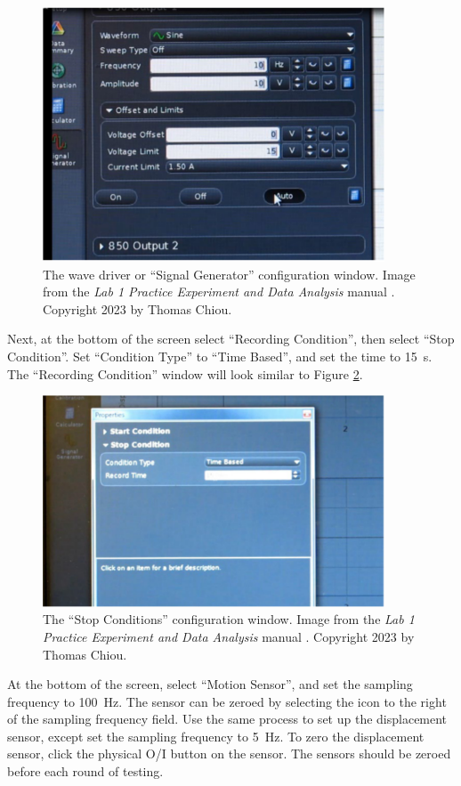 \documentclass[12 pt]{report}
\begin{document}
\begin{figure}[ht]
\centering
\includegraphics[width=4in]{images/Wave_Driver_Setup}
\caption{The wave driver or ``Signal Generator'' configuration window. Image from the \textit{Lab 1 Practice Experiment and Data Analysis} manual \cite{lab_procedures}. Copyright 2023 by Thomas Chiou.}
\label{fig:wave_driver_setup}
\end{figure}

Next, at the bottom of the screen select ``Recording Condition'', then select ``Stop Condition''. Set ``Condition Type'' to ``Time Based'', and set the time to \qty{15}{s}. The ``Recording Condition'' window will look similar to Figure \ref{fig:stop_conditions}. 

\begin{figure}[ht]
\centering
\includegraphics[width=4in]{images/Stop_Conditions}
\caption{The ``Stop Conditions'' configuration window. Image from the \textit{Lab 1 Practice Experiment and Data Analysis} manual \cite{lab_procedures}. Copyright 2023 by Thomas Chiou.}
\label{fig:stop_conditions}
\end{figure}

At the bottom of the screen, select ``Motion Sensor'', and set the sampling frequency to \qty{100}{Hz}. The sensor can be zeroed by selecting the icon to the right of the sampling frequency field. Use the same process to set up the displacement sensor, except set the sampling frequency to \qty{5}{Hz}. To zero the displacement sensor, click the physical O/I button on the sensor. The sensors should be zeroed before each round of testing.
\end{document}
